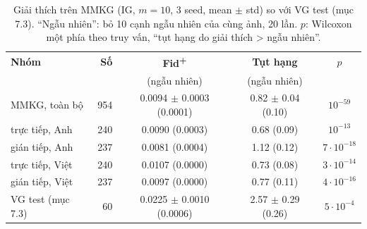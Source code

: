 \documentclass[12pt, a4paper]{article}
\newcommand{\pmm}{\ensuremath{\pm}}
\begin{document}
\begin{table}[H]
\centering\footnotesize
\caption{Giải thích trên MMKG (IG, $m=10$, 3 seed, mean \pmm{} std) so với VG test (mục 7.3). ``Ngẫu nhiên'': bỏ 10 cạnh ngẫu nhiên của cùng ảnh, 20 lần. $p$: Wilcoxon một phía theo truy vấn, ``tụt hạng do giải thích > ngẫu nhiên''.}
\label{tab:mmkg-xai}
\setlength{\tabcolsep}{3pt}
\begin{tabular}{l r c c c}
\toprule
\textbf{Nhóm} & \textbf{Số} & \textbf{Fid\textsuperscript{+}} & \textbf{Tụt hạng} & $p$ \\
 & & (ngẫu nhiên) & (ngẫu nhiên) & \\
\midrule
MMKG, toàn bộ & 954 & 0.0094 \pmm{} 0.0003 (0.0001) & 0.82 \pmm{} 0.04 (0.10) & $10^{-59}$ \\
\quad trực tiếp, Anh & 240 & 0.0090 (0.0003) & 0.68 (0.09) & $10^{-13}$ \\
\quad gián tiếp, Anh & 237 & 0.0081 (0.0004) & 1.12 (0.12) & $7\cdot10^{-18}$ \\
\quad trực tiếp, Việt & 240 & 0.0107 (0.0000) & 0.73 (0.08) & $3\cdot10^{-14}$ \\
\quad gián tiếp, Việt & 237 & 0.0097 (0.0000) & 0.77 (0.11) & $4\cdot10^{-16}$ \\
\midrule
VG test (mục 7.3) & 60 & 0.0225 \pmm{} 0.0010 (0.0006) & 2.57 \pmm{} 0.29 (0.26) & $5\cdot10^{-4}$ \\
\bottomrule
\end{tabular}
\end{table}
\end{document}
